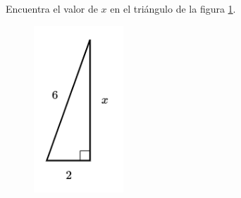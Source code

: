 \question[15]  Encuentra el valor de $x$ en el triángulo de la figura \ref{fig:lados_pitagoras_40}.
\begin{figure}[H]
    \begin{center}
        \includegraphics[width=0.3\textwidth]{../images/lados_pitagoras_40.png}
    \end{center}
    \caption{}
    \label{fig:lados_pitagoras_40}
\end{figure}